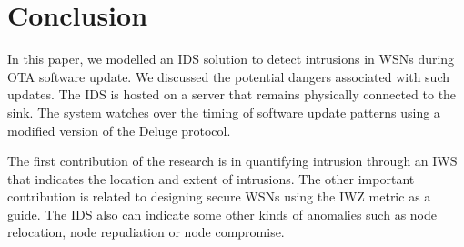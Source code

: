 \documentclass{CRPITStyle}
\begin{document}


\section{Conclusion}
\label{sec:concl}

In this paper, we modelled an IDS solution to detect intrusions in WSNs during OTA software update.
We discussed the potential dangers associated with such updates.
The IDS is hosted on a server that remains physically connected to the  sink. 
The system watches over the timing of software update patterns using a modified version of the Deluge protocol.

The first contribution of the research is in quantifying intrusion through an IWS that indicates the location and extent of intrusions.
The other important contribution is related to designing secure WSNs using the IWZ metric as a guide.
The IDS also can indicate some other kinds of anomalies such as node relocation, node repudiation or node compromise.
\end{document}
